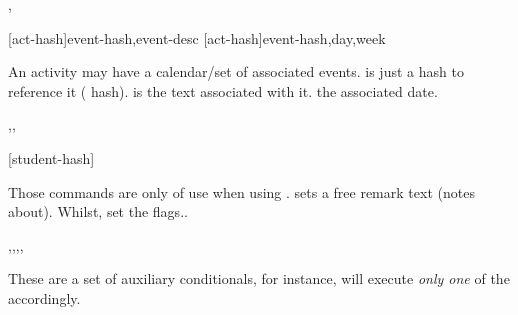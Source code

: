 \documentclass[article,nogeometry,english,tocdepth=3,secdepth=3]{ufrgscca} %
\begin{document}
\begin{codedescribe}[code,new=2023/11/18]{\ActivitySetNewEvent,\ActivitySetEventDay}
	\begin{codesyntax}%
    \tsmacro{\ActivitySetNewEvent}[act-hash]{event-hash,event-desc}
    \tsmacro{\ActivitySetEventDay}[act-hash]{event-hash,day,week}
	\end{codesyntax}
An activity may have a calendar/set of associated events.  is just a hash to reference it ( hash).  is the text associated with it.  the associated date.
\end{codedescribe}


\begin{codedescribe}[code,new=2023/11/18]{\studentremark,\studentnewpage,\distinctboard}
	\begin{codesyntax}%
		\tsmacro{\studentremark}{remarks}
		\tsmacro{\studentnewpage}[student-hash]{}
		\tsmacro{\distinctboard}{}
	\end{codesyntax}
Those commands are only of use when using . \tsmacro{\studentremark}{} sets a free remark text (notes about). Whilst, \tsobj{\distinctboard,\studentnewpage} set the  flags..
\end{codedescribe}


\begin{codedescribe}[code,new=2023/11/18]{\studentCase,\studentCoadvCase,\studentDismissCase,\studentNewPageCase,\studentDistinctBoardCase}
	\begin{codesyntax}%
	\end{codesyntax}
These are a set of auxiliary conditionals, for instance, \tsobj{\StudentCase} will execute \emph{only one} of the  accordingly.
\end{codedescribe}
\end{document}
